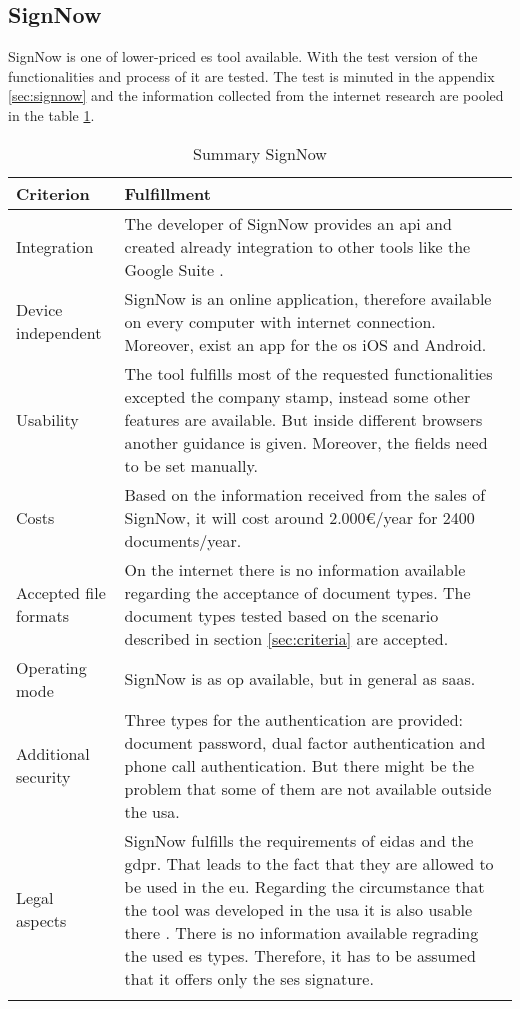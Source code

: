 \subsection{SignNow}
SignNow is one of lower-priced \gls{es} tool available. With the test version of the functionalities and process of it are tested. The test is minuted in the appendix \ref{sec:signnow} and the information collected from the internet research are pooled in the table \ref{tab:signnow}.
	\begin{longtable}{|p{4cm}|p{10cm}|} \hline
		Criterion & Fulfillment \\ \hline
		Integration & The developer of SignNow provides an \gls{api} and created already integration to other tools like the Google Suite \parencite{signnow2018enterprise,signnow2018price}.\\ \hline
		Device independent & SignNow is an online application, therefore available on every computer with internet connection. Moreover, exist an \gls{app} for the \gls{os} iOS and Android.\\ \hline
		Usability & The tool fulfills most of the requested functionalities excepted the company stamp, instead some other features are available. But inside different browsers another guidance is given. Moreover, the fields need to be set manually.\\ \hline
		Costs & Based on the information received from the sales of SignNow, it will cost around 2.000\euro /year for 2400 documents/year.\\ \hline
		Accepted file formats & On the internet there is no information available regarding the acceptance of document types. The document types tested based on the scenario described in section \ref{sec:criteria} are accepted.\\ \hline
		Operating mode & SignNow is as \gls{op} available, but in general as \gls{saas}. \parencite{signnow2018op} \\ \hline
		Additional security & Three types for the authentication are provided: document password, dual factor authentication and phone call authentication. But there might be the problem that some of them are not available outside the \gls{usa}. \parencite{signnow2018security} \\ \hline
		Legal aspects & SignNow fulfills the requirements of \gls{eidas} and the \gls{gdpr}. That leads to the fact that they are allowed to be used in the \gls{eu}. Regarding the circumstance that the tool was developed in the \gls{usa} it is also usable there \parencite{signnow2018legal}. There is no information available regrading the used \gls{es} types. Therefore, it has to be assumed that it offers only the \gls{ses} signature. \\ \hline
	\caption{Summary SignNow}
	\label{tab:signnow}
	\end{longtable}

